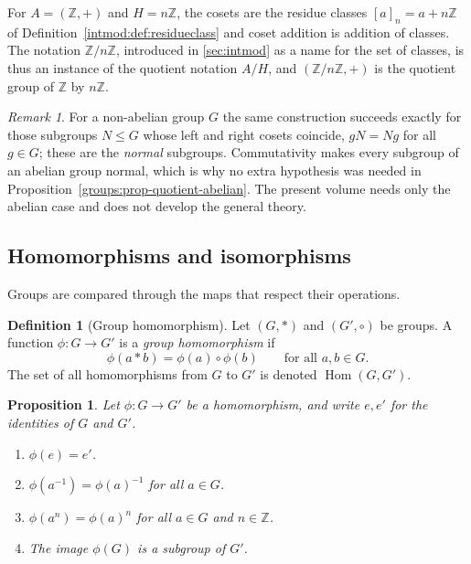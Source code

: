 \documentclass[11pt,a4paper]{article}
\newtheorem{proposition}[theorem]{Proposition}
\theoremstyle{definition}
\newtheorem{definition}[theorem]{Definition}
\theoremstyle{remark}
\newtheorem{remark}[theorem]{Remark}
\newcommand{\Z}{\ensuremath{\mathbb{Z}}}
\DeclareMathOperator{\Hom}{Hom}
\begin{document}
For \(A = (\Z,+)\) and \(H = n\Z\), the cosets are the residue classes
\([a]_n = a + n\Z\) of Definition~\ref{intmod:def:residueclass} and coset
addition is addition of classes. The notation \(\Z/n\Z\), introduced in
\cref{sec:intmod} as a name for the set of classes, is thus an instance of
the quotient notation \(A/H\), and \((\Z/n\Z,+)\) is the quotient group of
\(\Z\) by \(n\Z\).

\begin{remark}\label{groups:rem-quotient-nonabelian}
For a non-abelian group \(G\) the same construction succeeds exactly for
those subgroups \(N \le G\) whose left and right cosets coincide,
\(gN = Ng\) for all \(g \in G\); these are the \emph{normal} subgroups.
Commutativity makes every subgroup of an abelian group normal, which is
why no extra hypothesis was needed in
Proposition~\ref{groups:prop-quotient-abelian}. The present volume needs
only the abelian case and does not develop the general theory.
\end{remark}

\subsection{Homomorphisms and isomorphisms}\label{groups:sub:homs}

Groups are compared through the maps that respect their operations.

\begin{definition}[Group homomorphism]\label{groups:def-hom}
Let \((G,\ast)\) and \((G',\circ)\) be groups. A function
\(\phi \colon G \to G'\) is a \emph{group homomorphism} if
\[
\phi(a \ast b) = \phi(a) \circ \phi(b)
\qquad\text{for all } a, b \in G .
\]
The set of all homomorphisms from \(G\) to \(G'\) is denoted
\(\Hom(G, G')\).
\end{definition}

\begin{proposition}\label{groups:prop-hom-basic}
Let \(\phi \colon G \to G'\) be a homomorphism, and write \(e, e'\) for
the identities of \(G\) and \(G'\).
\begin{enumerate}
\item \(\phi(e) = e'\).
\item \(\phi(a^{-1}) = \phi(a)^{-1}\) for all \(a \in G\).
\item \(\phi(a^n) = \phi(a)^n\) for all \(a \in G\) and \(n \in \Z\).
\item The image \(\phi(G)\) is a subgroup of \(G'\).
\end{enumerate}
\end{proposition}
\end{document}
